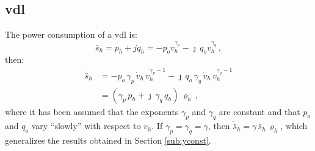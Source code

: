 \documentclass[journal, twocolumn, letter]{IEEEtran}
\newcommand{\vh}{v_h}
\newcommand{\vhdot}{\dot{v}_h}
\newcommand{\shdot}{\dot{\bar{s}}_h}
\newcommand{\rhoh}{\varrho_h}
\newcommand{\ph}{p_h}
\newcommand{\qh}{q_h}
\newcommand{\sh}{\bar{s}_h}
\newcommand{\jj}{\jmath}
\begin{document}
\subsection{\ac{vdl}}
\label{sub:vdl}

The power consumption of a \ac{vdl} is:
\begin{equation}
  \label{eq:vdl1}
  \sh = \ph + j \qh = -p_o \vh^{\gamma_p} - \jj \, q_o \vh^{\gamma_q} \, ,
\end{equation}
then:
\begin{equation}
  \label{eq:vdl2}
  \begin{aligned}
    \shdot &= -p_o \, \gamma_p \, \vhdot \, \vh^{\gamma_p-1} -
    \jj \, q_o \, \gamma_q \, \vhdot \, \vh^{\gamma_q-1} \\
    &=  (\gamma_p \, \ph + \jj \, \gamma_q \, \qh ) \, \rhoh \, ,
  \end{aligned}
\end{equation}
where it has been assumed that the exponents $\gamma_p$ and $\gamma_q$
are constant and that $p_o$ and $q_o$ vary ``slowly'' with respect to
$\vh$.  If $\gamma_p = \gamma_q = \gamma$, then
$\shdot = \gamma \, \sh \, \rhoh$, which generalizes the results
obtained in Section \ref{sub:yconst}.
\end{document}
